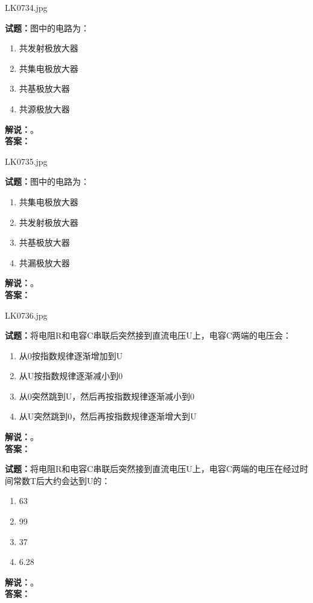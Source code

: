 \documentclass{ctexbook}
\begin{document}
\bigskip

LK0734.jpg


\noindent\textbf{试题：}图中的电路为：
\begin{enumerate}[leftmargin=3em]
\item 共发射极放大器
\item 共集电极放大器
\item 共基极放大器
\item 共源极放大器
\end{enumerate}
\noindent\textbf{解说：}\textbf{}。\\\noindent\textbf{答案：}

\bigskip

LK0735.jpg


\noindent\textbf{试题：}图中的电路为：
\begin{enumerate}[leftmargin=3em]
\item 共集电极放大器
\item 共发射极放大器
\item 共基极放大器
\item 共漏极放大器
\end{enumerate}
\noindent\textbf{解说：}\textbf{}。\\\noindent\textbf{答案：}

\bigskip

LK0736.jpg


\noindent\textbf{试题：}将电阻R和电容C串联后突然接到直流电压U上，电容C两端的电压会：
\begin{enumerate}[leftmargin=3em]
\item 从0按指数规律逐渐增加到U
\item 从U按指数规律逐渐减小到0
\item 从0突然跳到U，然后再按指数规律逐渐减小到0
\item 从U突然跳到0，然后再按指数规律逐渐增大到U
\end{enumerate}
\noindent\textbf{解说：}\textbf{}。\\\noindent\textbf{答案：}

\bigskip




\noindent\textbf{试题：}将电阻R和电容C串联后突然接到直流电压U上，电容C两端的电压在经过时间常数T后大约会达到U的：
\begin{enumerate}[leftmargin=3em]
\item 63%
\item 99%
\item 37%
\item 6.28%
\end{enumerate}
\noindent\textbf{解说：}\textbf{}。\\\noindent\textbf{答案：}
\end{document}

